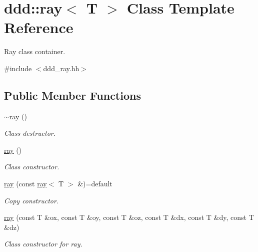 \hypertarget{classddd_1_1ray}{}\section{ddd\+:\+:ray$<$ T $>$ Class Template Reference}
\label{classddd_1_1ray}


Ray class container.  




{\ttfamily \#include $<$ddd\+\_\+ray.\+hh$>$}

\subsection*{Public Member Functions}
\begin{DoxyCompactItemize}
\item 
\mbox{\label{classddd_1_1ray_a1d3f28c826dfa86971a851ad6d385a53}} 
\hyperlink{classddd_1_1ray_a1d3f28c826dfa86971a851ad6d385a53}{$\sim$ray} ()
\begin{DoxyCompactList}\small\item\em Class destructor. \end{DoxyCompactList}\item 
\mbox{\label{classddd_1_1ray_a608816826f457db78e459e7c1f0d5a3a}} 
\hyperlink{classddd_1_1ray_a608816826f457db78e459e7c1f0d5a3a}{ray} ()
\begin{DoxyCompactList}\small\item\em Class constructor. \end{DoxyCompactList}\item 
\mbox{\label{classddd_1_1ray_a7262ad98c0ba222969241df6e3986f2d}} 
\hyperlink{classddd_1_1ray_a7262ad98c0ba222969241df6e3986f2d}{ray} (const \hyperlink{classddd_1_1ray}{ray}$<$ T $>$ \&)=default
\begin{DoxyCompactList}\small\item\em Copy constructor. \end{DoxyCompactList}\item 
\mbox{\label{classddd_1_1ray_ac3d4624fdf4cbdd1b211ce2b02957d35}} 
\hyperlink{classddd_1_1ray_ac3d4624fdf4cbdd1b211ce2b02957d35}{ray} (const T \&ox, const T \&oy, const T \&oz, const T \&dx, const T \&dy, const T \&dz)
\begin{DoxyCompactList}\small\item\em Class constructor for ray. \end{DoxyCompactList}\item 

\end{DoxyCompactItemize}

